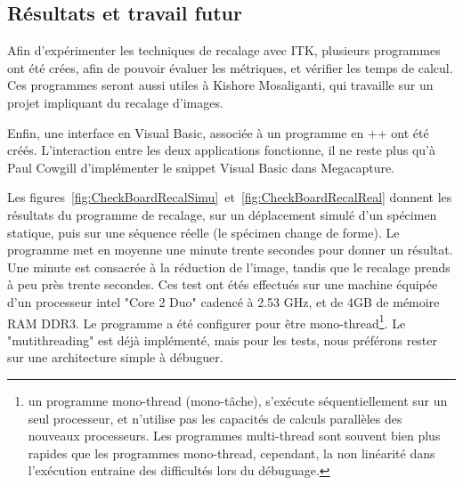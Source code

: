 \subsection{Résultats et travail futur}

Afin d'expérimenter les techniques de recalage avec ITK, plusieurs programmes ont été crées, afin de pouvoir évaluer les métriques, et vérifier les temps de calcul. Ces programmes seront aussi utiles à Kishore Mosaliganti, qui travaille sur un projet impliquant du recalage d'images.

Enfin, une interface en Visual Basic, associée à un programme en \C++ ont été créés. L'interaction entre les deux applications fonctionne, il ne reste plus qu'à Paul Cowgill d'implémenter le snippet Visual Basic dans Megacapture.

Les figures~\ref{fig:CheckBoardRecalSimu}~et~\ref{fig:CheckBoardRecalReal}  donnent les résultats du programme de recalage, sur un déplacement simulé d'un spécimen statique, puis sur une séquence réelle (le spécimen change de forme).
Le programme met en moyenne une minute trente secondes pour donner un résultat.
Une minute est consacrée à la réduction de l'image, tandis que le recalage prends à peu près trente secondes.
Ces test ont étés effectués sur une machine équipée d'un processeur intel "Core 2 Duo" cadencé à 2.53 GHz, et de 4GB de mémoire RAM DDR3. Le programme a été configurer pour être mono-thread\footnote{un programme mono-thread (mono-tâche), s'exécute séquentiellement sur un seul processeur, et n'utilise pas les capacités de calculs parallèles des nouveaux processeurs. Les programmes multi-thread sont souvent bien plus rapides que les programmes mono-thread, cependant, la non linéarité dans l'exécution entraine des difficultés lors du débuguage.}. Le "mutithreading" est déjà implémenté, mais pour les tests, nous préférons rester sur une architecture simple à débuguer.


